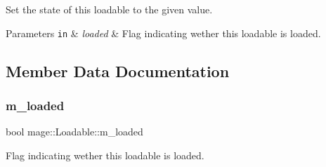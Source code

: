 Set the state of this loadable to the given value.


\begin{DoxyParams}[1]{Parameters}
\mbox{\tt in}  & {\em loaded} & Flag indicating wether this loadable is loaded. \\
\hline
\end{DoxyParams}


\subsection{Member Data Documentation}
\hypertarget{classmage_1_1_loadable_a993963fbfeb0f2e2ab9616bf7ef6a0f7}{}\label{classmage_1_1_loadable_a993963fbfeb0f2e2ab9616bf7ef6a0f7} 
\subsubsection{\texorpdfstring{m\+\_\+loaded}{m\_loaded}}
{\footnotesize\ttfamily bool mage\+::\+Loadable\+::m\+\_\+loaded\hspace{0.3cm}{\ttfamily [private]}}

Flag indicating wether this loadable is loaded. 